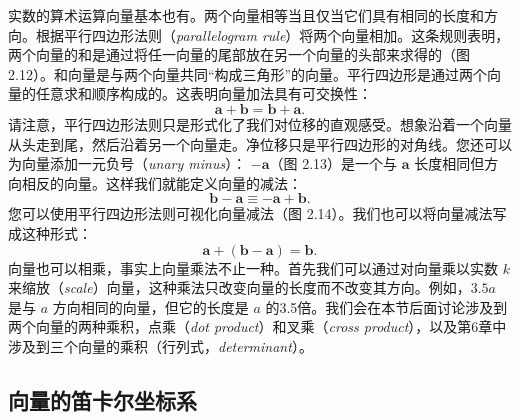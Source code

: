 \documentclass[lang=cn,12pt,marginpar=margintrue]{elegantbook}
\begin{document}
实数的算术运算向量基本也有。两个向量相等当且仅当它们具有相同的长度和方向。根据平行四边形法则（\textit{parallelogram rule}）将两个向量相加。这条规则表明，两个向量的和是通过将任一向量的尾部放在另一个向量的头部来求得的（图 2.12）。和向量是与两个向量共同“构成三角形”的向量。平行四边形是通过两个向量的任意求和顺序构成的。这表明向量加法具有可交换性：
\[
  \mathbf{a}+\mathbf{b}=\mathbf{b}+\mathbf{a}.
\]
请注意，平行四边形法则只是形式化了我们对位移的直观感受。想象沿着一个向量从头走到尾，然后沿着另一个向量走。净位移只是平行四边形的对角线。您还可以为向量添加一元负号（\textit{unary minus}）： $-\mathbf{a}$（图 2.13）是一个与 $\mathbf{a}$ 长度相同但方向相反的向量。这样我们就能定义向量的减法：
\[
  \mathbf{b}-\mathbf{a} \equiv -\mathbf{a}+\mathbf{b}.
\]
您可以使用平行四边形法则可视化向量减法（图 2.14）。我们也可以将向量减法写成这种形式：
\[
  \mathbf{a}+(\mathbf{b}-\mathbf{a})=\mathbf{b}.
\]
向量也可以相乘，事实上向量乘法不止一种。首先我们可以通过对向量乘以实数 $k$ 来缩放（\textit{scale}）向量，这种乘法只改变向量的长度而不改变其方向。例如，$3.5a$ 是与 $a$ 方向相同的向量，但它的长度是 $a$ 的3.5倍。我们会在本节后面讨论涉及到两个向量的两种乘积，点乘（\textit{dot product}）和叉乘（\textit{cross product}），以及第6章中涉及到三个向量的乘积（行列式，\textit{determinant}）。

\subsection{向量的笛卡尔坐标系}

\end{document}

